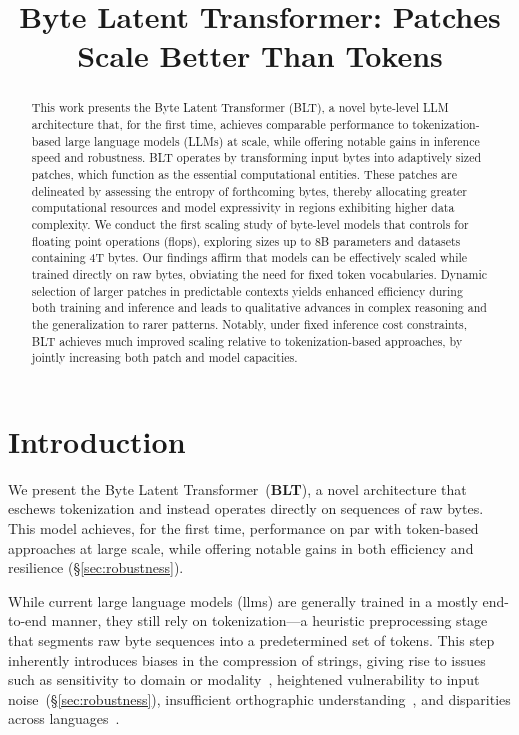 \title{Byte Latent Transformer: Patches Scale Better Than Tokens}

\begin{abstract}
This work presents the Byte Latent Transformer ({\textsc BLT}), a novel byte-level LLM architecture that, for the first time, achieves comparable performance to tokenization-based large language models (LLMs) at scale, while offering notable gains in inference speed and robustness. {\textsc BLT} operates by transforming input bytes into adaptively sized patches, which function as the essential computational entities. These patches are delineated by assessing the entropy of forthcoming bytes, thereby allocating greater computational resources and model expressivity in regions exhibiting higher data complexity. We conduct the first scaling study of byte-level models that controls for floating point operations (flops), exploring sizes up to 8B parameters and datasets containing 4T bytes. Our findings affirm that models can be effectively scaled while trained directly on raw bytes, obviating the need for fixed token vocabularies. Dynamic selection of larger patches in predictable contexts yields enhanced efficiency during both training and inference and leads to qualitative advances in complex reasoning and the generalization to rarer patterns. Notably, under fixed inference cost constraints, {\textsc BLT} achieves much improved scaling relative to tokenization-based approaches, by jointly increasing both patch and model capacities.
\end{abstract}

\section{Introduction}
\label{section:intro}

We present the Byte Latent Transformer~(\textbf{BLT}), a novel architecture that eschews tokenization and instead operates directly on sequences of raw bytes. This model achieves, for the first time, performance on par with token-based approaches at large scale, while offering notable gains in both efficiency and resilience (\S\ref{sec:robustness}).

While current large language models (llms) are generally trained in a mostly end-to-end manner, they still rely on tokenization—a heuristic preprocessing stage that segments raw byte sequences into a predetermined set of tokens. This step inherently introduces biases in the compression of strings, giving rise to issues such as sensitivity to domain or modality~\citep{dagangetting}, heightened vulnerability to input noise~(\S\ref{sec:robustness}), insufficient orthographic understanding~\citep{edman2024cute}, and disparities across languages~\citep{liang2023xlm,petrov2024language,limisiewicz2024myte}.

